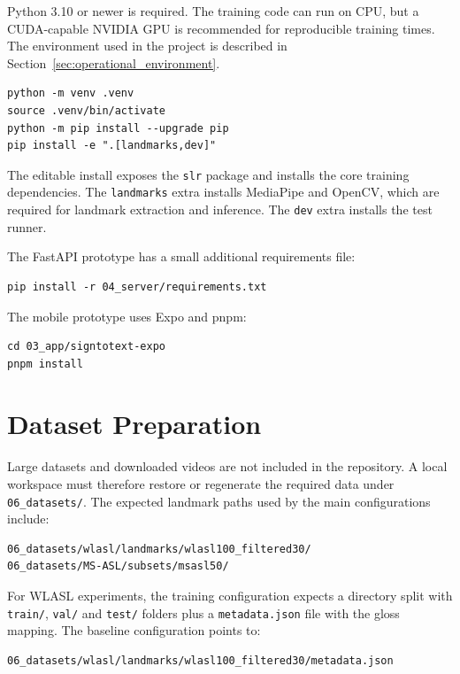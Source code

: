 Python 3.10 or newer is required. The training code can run on CPU, but a CUDA-capable NVIDIA GPU
is recommended for reproducible training times. The environment used in the project is described in
Section~\ref{sec:operational_environment}.

\begin{verbatim}
python -m venv .venv
source .venv/bin/activate
python -m pip install --upgrade pip
pip install -e ".[landmarks,dev]"
\end{verbatim}

The editable install exposes the \texttt{slr} package and installs the core training dependencies.
The \texttt{landmarks} extra installs MediaPipe and OpenCV, which are required for landmark
extraction and inference. The \texttt{dev} extra installs the test runner.

The FastAPI prototype has a small additional requirements file:

\begin{verbatim}
pip install -r 04_server/requirements.txt
\end{verbatim}

The mobile prototype uses Expo and pnpm:

\begin{verbatim}
cd 03_app/signtotext-expo
pnpm install
\end{verbatim}

\section{Dataset Preparation}
\label{app:user_manual_datasets}

Large datasets and downloaded videos are not included in the repository. A local workspace must
therefore restore or regenerate the required data under \texttt{06\_datasets/}. The expected
landmark paths used by the main configurations include:

\begin{verbatim}
06_datasets/wlasl/landmarks/wlasl100_filtered30/
06_datasets/MS-ASL/subsets/msasl50/
\end{verbatim}

For WLASL experiments, the training configuration expects a directory split with \texttt{train/},
\texttt{val/} and \texttt{test/} folders plus a \texttt{metadata.json} file with the gloss mapping.
The baseline configuration points to:

\begin{verbatim}
06_datasets/wlasl/landmarks/wlasl100_filtered30/metadata.json
\end{verbatim}

